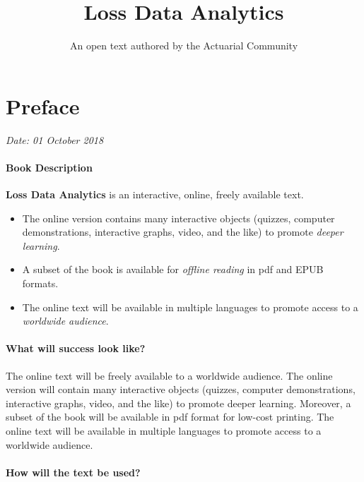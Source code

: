\documentclass[]{book}
\title{Loss Data Analytics}
\author{An open text authored by the Actuarial Community}
\date{}
\providecommand{\tightlist}{%
  \setlength{\itemsep}{0pt}\setlength{\parskip}{0pt}}
\theoremstyle{definition}
\theoremstyle{definition}
\theoremstyle{definition}
\theoremstyle{remark}
\begin{document}
\maketitle

{
\setcounter{tocdepth}{2}
\tableofcontents
}
\chapter*{Preface}\label{preface}

\emph{Date: 01 October 2018}

\subsubsection*{Book Description}\label{book-description}

\textbf{Loss Data Analytics} is an interactive, online, freely available
text.

\begin{itemize}
\tightlist
\item
  The online version contains many interactive objects (quizzes,
  computer demonstrations, interactive graphs, video, and the like) to
  promote \emph{deeper learning}.
\item
  A subset of the book is available for \emph{offline reading} in pdf
  and EPUB formats.
\item
  The online text will be available in multiple languages to promote
  access to a \emph{worldwide audience}.
\end{itemize}

\subsubsection*{What will success look
like?}\label{what-will-success-look-like}

The online text will be freely available to a worldwide audience. The
online version will contain many interactive objects (quizzes, computer
demonstrations, interactive graphs, video, and the like) to promote
deeper learning. Moreover, a subset of the book will be available in pdf
format for low-cost printing. The online text will be available in
multiple languages to promote access to a worldwide audience.

\subsubsection*{How will the text be
used?}\label{how-will-the-text-be-used}
\end{document}
